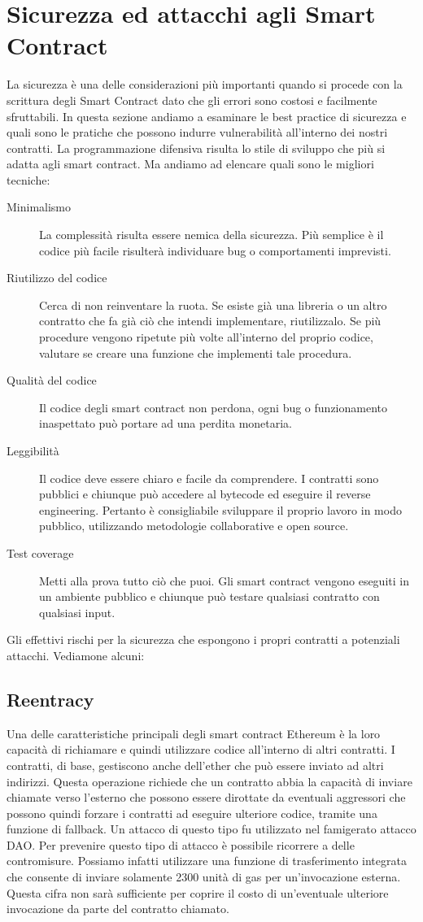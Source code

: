 \section{Sicurezza ed attacchi agli Smart Contract}
La sicurezza è una delle considerazioni più importanti quando si procede con la scrittura degli Smart Contract dato che gli errori sono costosi e facilmente sfruttabili. In questa sezione andiamo a esaminare le best practice di sicurezza e quali sono le pratiche che possono indurre vulnerabilità all'interno dei nostri contratti.
La programmazione difensiva risulta lo stile di sviluppo che più si adatta agli smart contract. Ma andiamo ad elencare quali sono le migliori tecniche:
\begin{description}
	\item[Minimalismo] La complessità risulta essere nemica della sicurezza. Più semplice è il codice più facile risulterà individuare bug o comportamenti imprevisti. 
	\item[Riutilizzo del codice] Cerca di non reinventare la ruota. Se esiste già una libreria o un altro contratto che fa già ciò che intendi implementare, riutilizzalo. Se più procedure vengono ripetute più volte all'interno del proprio codice, valutare se creare una funzione che implementi tale procedura.
	\item[Qualità del codice] Il codice degli smart contract non perdona, ogni bug o funzionamento inaspettato può portare ad una perdita monetaria.
	\item[Leggibilità] Il codice deve essere chiaro e facile da comprendere. I contratti sono pubblici e chiunque può accedere al bytecode ed eseguire il reverse engineering. Pertanto è consigliabile sviluppare il proprio lavoro in modo pubblico, utilizzando metodologie collaborative e open source.
	\item[Test coverage] Metti alla prova tutto ciò che puoi. Gli smart contract vengono eseguiti in un ambiente pubblico e chiunque può testare qualsiasi contratto con qualsiasi input.
\end{description}
Gli effettivi rischi per la sicurezza che espongono i propri contratti a potenziali attacchi. Vediamone alcuni:
\subsection*{Reentracy}
Una delle caratteristiche principali degli smart contract Ethereum è la loro capacità di richiamare e quindi utilizzare codice all'interno di altri contratti. I contratti, di base, gestiscono anche dell'ether che può essere inviato ad altri indirizzi. Questa operazione richiede che un contratto abbia la capacità di inviare chiamate verso l'esterno che possono essere dirottate da eventuali aggressori che possono quindi forzare i contratti ad eseguire ulteriore codice, tramite una funzione di fallback. Un attacco di questo tipo fu utilizzato nel famigerato attacco DAO. Per prevenire questo tipo di attacco è possibile ricorrere a delle contromisure. Possiamo infatti utilizzare una funzione di trasferimento integrata che consente di inviare solamente 2300 unità di gas per un'invocazione esterna. Questa cifra non sarà sufficiente per coprire il costo di un'eventuale ulteriore invocazione da parte del contratto chiamato.

